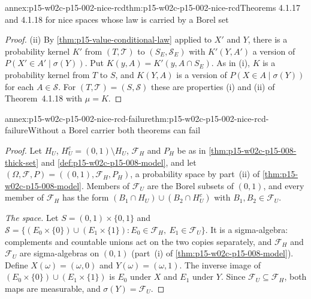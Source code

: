 \begin{annexitem}{annex:p15-w02c-p15-002-nice-rcd}{thm:p15-w02c-p15-002-nice-rcd}{Theorems 4.1.17 and 4.1.18 for nice spaces whose law is carried by a Borel set}
\begin{proof}
(ii) By \cref{thm:p15-value-conditional-law} applied to \(X'\) and \(Y\),
there is a probability kernel \(K'\) from \((T,\mathcal T)\) to
\((S_E,\mathcal S_E)\) with \(K'(Y,A')\) a version of
\(P(X'\in A'\mid\sigma(Y))\). Put \(K(y,A)=K'(y,A\cap S_E)\). As in (i),
\(K\) is a probability kernel from \(T\) to \(S\), and \(K(Y,A)\) is a
version of \(P(X\in A\mid\sigma(Y))\) for each \(A\in\mathcal S\). For
\((T,\mathcal T)=(S,\mathcal S)\) these are properties (i) and (ii) of
Theorem~4.1.18 with \(\mu=K\).
\end{proof}
\end{annexitem}

\begin{annexitem}{annex:p15-w02c-p15-002-nice-rcd-failure}{thm:p15-w02c-p15-002-nice-rcd-failure}{Without a Borel carrier both theorems can fail}
\begin{proof}
Let \(H_U\), \(H_U^c=(0,1)\setminus H_U\), \(\mathcal F_H\) and \(P_H\) be as
in \cref{thm:p15-w02c-p15-008-thick-set} and
\cref{def:p15-w02c-p15-008-model}, and let
\((\Omega,\mathcal F,P)=((0,1),\mathcal F_H,P_H)\), a probability space by
part~(ii) of \cref{thm:p15-w02c-p15-008-model}. Members of \(\mathcal F_U\)
are the Borel subsets of \((0,1)\), and every member of \(\mathcal F_H\)
has the form \((B_1\cap H_U)\cup(B_2\cap H_U^c)\) with
\(B_1,B_2\in\mathcal F_U\).

\emph{The space.} Let \(S=(0,1)\times\{0,1\}\) and
\(\mathcal S=\{(E_0\times\{0\})\cup(E_1\times\{1\}):E_0\in\mathcal F_H,\
E_1\in\mathcal F_U\}\). It is a sigma-algebra: complements and countable
unions act on the two copies separately, and \(\mathcal F_H\) and
\(\mathcal F_U\) are sigma-algebras on \((0,1)\) (part~(i) of
\cref{thm:p15-w02c-p15-008-model}). Define \(X(\omega)=(\omega,0)\) and
\(Y(\omega)=(\omega,1)\). The inverse image of
\((E_0\times\{0\})\cup(E_1\times\{1\})\) is \(E_0\) under \(X\) and \(E_1\)
under \(Y\). Since \(\mathcal F_U\subseteq\mathcal F_H\), both maps are
measurable, and \(\sigma(Y)=\mathcal F_U\).


\end{proof}
\end{annexitem}
